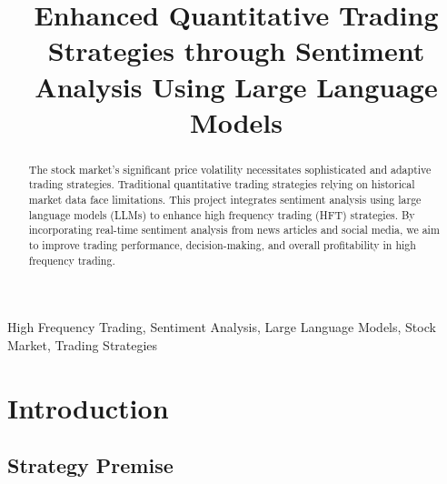 \documentclass[conference]{IEEEtran}
\begin{document}
\title{Enhanced Quantitative Trading Strategies through Sentiment Analysis Using Large Language Models}

\author{
\and
{}
\and
{}
}

\maketitle

\begin{abstract}
The stock market's significant price volatility necessitates sophisticated and adaptive trading strategies. Traditional quantitative trading strategies relying on historical market data face limitations. This project integrates sentiment analysis using large language models (LLMs) to enhance high frequency trading (HFT) strategies. By incorporating real-time sentiment analysis from news articles and social media, we aim to improve trading performance, decision-making, and overall profitability in high frequency trading.
\end{abstract}

\begin{IEEEkeywords}
High Frequency Trading, Sentiment Analysis, Large Language Models, Stock Market, Trading Strategies
\end{IEEEkeywords}

\section{\textbf{Introduction}}

\subsection{\textbf{Strategy Premise}}
\end{document}
